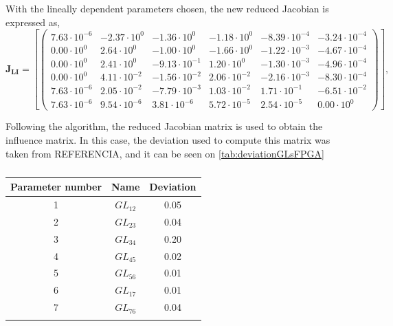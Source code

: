 With the lineally dependent parameters chosen, the new reduced Jacobian is expressed as,
\begin{equation}
    \boldsymbol{J_{LI}} = \left[\begin{pmatrix}
      7.63 \cdot 10^{-6} & -2.37 \cdot 10^{0} & -1.36 \cdot 10^{0} & -1.18 \cdot 10^{0} & -8.39 \cdot 10^{-4} & -3.24 \cdot 10^{-4} \\
      0.00 \cdot 10^{0} & 2.64 \cdot 10^{0} & -1.00 \cdot 10^{0} & -1.66 \cdot 10^{0} & -1.22 \cdot 10^{-3} & -4.67 \cdot 10^{-4} \\
      0.00 \cdot 10^{0} & 2.41 \cdot 10^{0} & -9.13 \cdot 10^{-1} & 1.20 \cdot 10^{0} & -1.30 \cdot 10^{-3} & -4.96 \cdot 10^{-4} \\
      0.00 \cdot 10^{0} & 4.11 \cdot 10^{-2} & -1.56 \cdot 10^{-2} & 2.06 \cdot 10^{-2} & -2.16 \cdot 10^{-3} & -8.30 \cdot 10^{-4} \\
      7.63 \cdot 10^{-6} & 2.05 \cdot 10^{-2} & -7.79 \cdot 10^{-3} & 1.03 \cdot 10^{-2} & 1.71 \cdot 10^{-1} & -6.51 \cdot 10^{-2} \\
      7.63 \cdot 10^{-6} & 9.54 \cdot 10^{-6} & 3.81 \cdot 10^{-6} & 5.72 \cdot 10^{-5} & 2.54 \cdot 10^{-5} & 0.00 \cdot 10^{0}
    \end{pmatrix}\right],
    \label{eq:jacobianredFPGA}
    \end{equation}
    
    
Following the algorithm, the reduced Jacobian matrix is used to obtain the influence matrix. In this case, the deviation used to compute this matrix was taken from REFERENCIA, and it can be seen on \autoref{tab:deviationGLsFPGA}

\begin{table}[H]
\centering
\caption{}
\label{tab:deviationGLsFPGA}

\begin{tabular}{c c c}
\toprule
\multicolumn{1}{c}{\textbf{Parameter number}} & \multicolumn{1}{c}{\textbf{Name}} & \multicolumn{1}{c}{\textbf{Deviation}} \\ \midrule
1 & $GL_{12}$ & 0.05 \\
2 & $GL_{23}$ & 0.04 \\
3 & $GL_{34}$ & 0.20 \\
4 & $GL_{45}$ & 0.02 \\
5 & $GL_{56}$ & 0.01 \\
6 & $GL_{17}$ & 0.01 \\
7 & $GL_{76}$ & 0.04 \\\\ \bottomrule  
\end{tabular}
\end{table}

